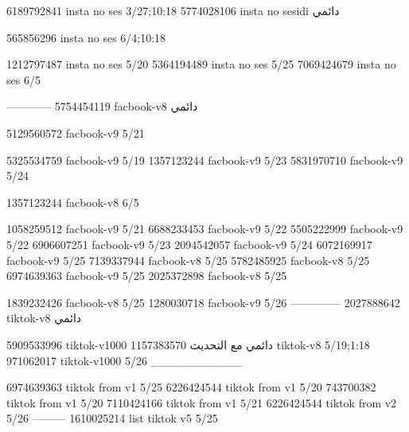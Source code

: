 
6189792841 insta no ses
3/27;10:18
5774028106 insta no sesidi
دائمي


565856296 insta no ses
6/4;10:18


1212797487 insta no ses
5/20
5364194489 insta no ses
5/25
7069424679 insta no ses
6/5

------------
5754454119 facbook-v8
دائمي

5129560572 facbook-v9
5/21

5325534759 facbook-v9
5/19
1357123244 facbook-v9
5/23
5831970710 facbook-v9
5/24

1357123244 facbook-v8
6/5

1058259512 facbook-v9
5/21
6688233453 facbook-v9
5/22
5505222999 facbook-v9
5/22
6906607251 facbook-v9
5/23
2094542057 facbook-v9
5/24
6072169917 facbook-v9
5/25
7139337944 facbook-v8
5/25
5782485925 facbook-v8
5/25
6974639363 facbook-v9
5/25
2025372898 facbook-v8
5/25

1839232426 facbook-v8
5/25
1280030718 facbook-v9
5/26
--------------
2027888642 tiktok-v8
دائمي

5909533996 tiktok-v1000
دائمي مع التحديث
1157383570 tiktok-v8
5/19;1:18
971062017 tiktok-v1000
5/26
___________

6974639363 tiktok from v1
5/25
6226424544 tiktok from v1
5/20
743700382 tiktok from v1
5/20
7110424166 tiktok from v1
5/21
6226424544 tiktok from v2
5/26
---------
1610025214 list tiktok v5
5/25
